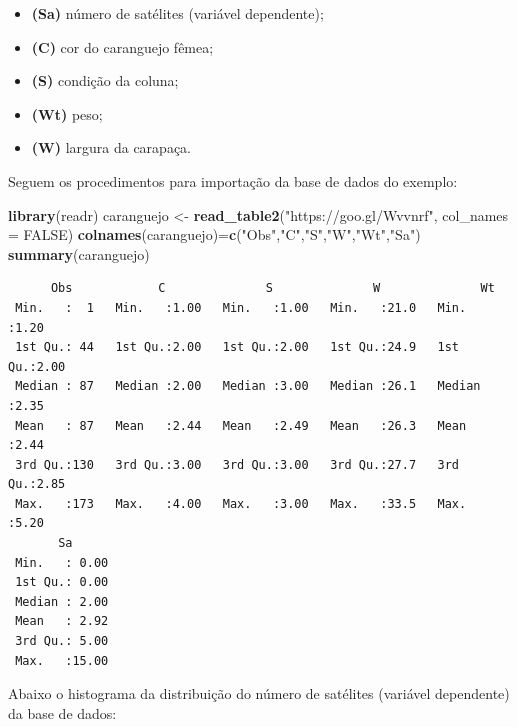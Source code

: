 \documentclass[12pt,brazil,oneside]{book}
\newenvironment{Shaded}{\begin{snugshade}}{\end{snugshade}}
\newcommand{\DataTypeTok}[1]{\textcolor[rgb]{0.13,0.29,0.53}{#1}}
\newcommand{\KeywordTok}[1]{\textcolor[rgb]{0.13,0.29,0.53}{\textbf{#1}}}
\newcommand{\NormalTok}[1]{#1}
\newcommand{\OperatorTok}[1]{\textcolor[rgb]{0.81,0.36,0.00}{\textbf{#1}}}
\newcommand{\OtherTok}[1]{\textcolor[rgb]{0.56,0.35,0.01}{#1}}
\newcommand{\StringTok}[1]{\textcolor[rgb]{0.31,0.60,0.02}{#1}}
\providecommand{\tightlist}{%
  \setlength{\itemsep}{0pt}\setlength{\parskip}{0pt}}
\begin{document}
\begin{itemize}
\tightlist
\item
  \textbf{(Sa)} número de satélites (variável dependente);
\item
  \textbf{(C)} cor do caranguejo fêmea;
\item
  \textbf{(S)} condição da coluna;
\item
  \textbf{(Wt)} peso;
\item
  \textbf{(W)} largura da carapaça.
\end{itemize}

Seguem os procedimentos para importação da base de dados do exemplo:

\begin{Shaded}
\begin{Highlighting}[]
\KeywordTok{library}\NormalTok{(readr)}
\NormalTok{caranguejo <-}\StringTok{ }\KeywordTok{read_table2}\NormalTok{(}\StringTok{"https://goo.gl/Wvvnrf"}\NormalTok{, }
    \DataTypeTok{col_names =} \OtherTok{FALSE}\NormalTok{)}
\KeywordTok{colnames}\NormalTok{(caranguejo)=}\KeywordTok{c}\NormalTok{(}\StringTok{"Obs"}\NormalTok{,}\StringTok{"C"}\NormalTok{,}\StringTok{"S"}\NormalTok{,}\StringTok{"W"}\NormalTok{,}\StringTok{"Wt"}\NormalTok{,}\StringTok{"Sa"}\NormalTok{)}
\KeywordTok{summary}\NormalTok{(caranguejo)}
\end{Highlighting}
\end{Shaded}

\begin{verbatim}
      Obs            C              S              W              Wt      
 Min.   :  1   Min.   :1.00   Min.   :1.00   Min.   :21.0   Min.   :1.20  
 1st Qu.: 44   1st Qu.:2.00   1st Qu.:2.00   1st Qu.:24.9   1st Qu.:2.00  
 Median : 87   Median :2.00   Median :3.00   Median :26.1   Median :2.35  
 Mean   : 87   Mean   :2.44   Mean   :2.49   Mean   :26.3   Mean   :2.44  
 3rd Qu.:130   3rd Qu.:3.00   3rd Qu.:3.00   3rd Qu.:27.7   3rd Qu.:2.85  
 Max.   :173   Max.   :4.00   Max.   :3.00   Max.   :33.5   Max.   :5.20  
       Sa       
 Min.   : 0.00  
 1st Qu.: 0.00  
 Median : 2.00  
 Mean   : 2.92  
 3rd Qu.: 5.00  
 Max.   :15.00  
\end{verbatim}

Abaixo o histograma da distribuição do número de satélites (variável dependente) da base de dados:

\begin{Shaded}
\end{Shaded}
\end{document}
